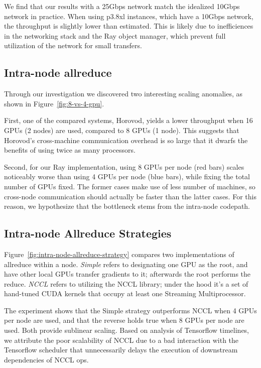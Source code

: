 We find that our results with a 25Gbps network match the idealized 10Gbps network in practice. When using p3.8xl instances, which have a 10Gbps network, the throughput is slightly lower than estimated. This is likely due to inefficiences in the networking stack and the Ray object manager, which prevent full utilization of the network for small transfers.

\subsection{Intra-node allreduce}
Through our investigation we discovered two interesting scaling anomalies, as
shown in Figure~\ref{fig:8-vs-4-gpu}.

First, one of the compared systems, Horovod, yields a lower throughput when 16
GPUs (2 nodes) are used, compared to 8 GPUs (1 node).  This suggests that
Horovod's cross-machine communication overhead is so large that it dwarfs the
benefits of using twice as many processors.

Second, for our Ray implementation, using 8 GPUs per node (red bars) scales
noticeably worse than using 4 GPUs per node (blue bars), while fixing the total
number of GPUs fixed.  The former cases make use of less number of machines, so
cross-node communication should actually be faster than the latter cases.  For
this reason, we hypothesize that the bottleneck stems from the intra-node
codepath.

\subsection{Intra-node Allreduce Strategies}
Figure~\ref{fig:intra-node-allreduce-strategy} compares two implementations of
allreduce within a node.  \emph{Simple} refers to designating one GPU as the
root, and have other local GPUs transfer gradients to it; afterwards the root
performs the reduce.  \emph{NCCL} refers to utilizing the NCCL library; under
the hood it's a set of hand-tuned CUDA kernels that occupy at least one
Streaming Multiprocessor.

The experiment shows that the Simple strategy outperforms NCCL when 4 GPUs per
node are used, and that the reverse holds true when 8 GPUs per node are
used. Both provide sublinear scaling. Based on analysis of Tensorflow timelines, 
we attribute the poor scalability of NCCL due to a bad interaction with the
Tensorflow scheduler that unnecessarily delays
the execution of downstream dependencies of NCCL ops.

